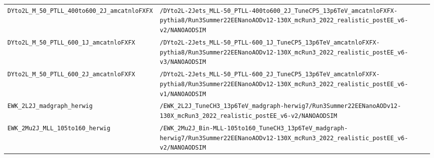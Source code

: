 \begin{longtable}{@{}>{\RaggedRight\arraybackslash}p{} >{\RaggedRight\arraybackslash}p{}@{}}
\addlinespace[2pt]
\texttt{DYto2L\_\allowbreak{}M\_\allowbreak{}50\_\allowbreak{}PTLL\_\allowbreak{}400to600\_\allowbreak{}2J\_\allowbreak{}amcatnloFXFX} & \texttt{/\allowbreak{}DYto2L-\allowbreak{}2Jets\_\allowbreak{}MLL-\allowbreak{}50\_\allowbreak{}PTLL-\allowbreak{}400to600\_\allowbreak{}2J\_\allowbreak{}TuneCP5\_\allowbreak{}13p6TeV\_\allowbreak{}amcatnloFXFX-\allowbreak{}pythia8/\allowbreak{}Run3Summer22EENanoAODv12-\allowbreak{}130X\_\allowbreak{}mcRun3\_\allowbreak{}2022\_\allowbreak{}realistic\_\allowbreak{}postEE\_\allowbreak{}v6-\allowbreak{}v2/\allowbreak{}NANOAODSIM} \\
\addlinespace[2pt]
\texttt{DYto2L\_\allowbreak{}M\_\allowbreak{}50\_\allowbreak{}PTLL\_\allowbreak{}600\_\allowbreak{}1J\_\allowbreak{}amcatnloFXFX} & \texttt{/\allowbreak{}DYto2L-\allowbreak{}2Jets\_\allowbreak{}MLL-\allowbreak{}50\_\allowbreak{}PTLL-\allowbreak{}600\_\allowbreak{}1J\_\allowbreak{}TuneCP5\_\allowbreak{}13p6TeV\_\allowbreak{}amcatnloFXFX-\allowbreak{}pythia8/\allowbreak{}Run3Summer22EENanoAODv12-\allowbreak{}130X\_\allowbreak{}mcRun3\_\allowbreak{}2022\_\allowbreak{}realistic\_\allowbreak{}postEE\_\allowbreak{}v6-\allowbreak{}v3/\allowbreak{}NANOAODSIM} \\
\addlinespace[2pt]
\texttt{DYto2L\_\allowbreak{}M\_\allowbreak{}50\_\allowbreak{}PTLL\_\allowbreak{}600\_\allowbreak{}2J\_\allowbreak{}amcatnloFXFX} & \texttt{/\allowbreak{}DYto2L-\allowbreak{}2Jets\_\allowbreak{}MLL-\allowbreak{}50\_\allowbreak{}PTLL-\allowbreak{}600\_\allowbreak{}2J\_\allowbreak{}TuneCP5\_\allowbreak{}13p6TeV\_\allowbreak{}amcatnloFXFX-\allowbreak{}pythia8/\allowbreak{}Run3Summer22EENanoAODv12-\allowbreak{}130X\_\allowbreak{}mcRun3\_\allowbreak{}2022\_\allowbreak{}realistic\_\allowbreak{}postEE\_\allowbreak{}v6-\allowbreak{}v1/\allowbreak{}NANOAODSIM} \\
\addlinespace[2pt]
\texttt{EWK\_\allowbreak{}2L2J\_\allowbreak{}madgraph\_\allowbreak{}herwig} & \texttt{/\allowbreak{}EWK\_\allowbreak{}2L2J\_\allowbreak{}TuneCH3\_\allowbreak{}13p6TeV\_\allowbreak{}madgraph-\allowbreak{}herwig7/\allowbreak{}Run3Summer22EENanoAODv12-\allowbreak{}130X\_\allowbreak{}mcRun3\_\allowbreak{}2022\_\allowbreak{}realistic\_\allowbreak{}postEE\_\allowbreak{}v6-\allowbreak{}v2/\allowbreak{}NANOAODSIM} \\
\addlinespace[2pt]
\texttt{EWK\_\allowbreak{}2Mu2J\_\allowbreak{}MLL\_\allowbreak{}105to160\_\allowbreak{}herwig} & \texttt{/\allowbreak{}EWK\_\allowbreak{}2Mu2J\_\allowbreak{}Bin-\allowbreak{}MLL-\allowbreak{}105to160\_\allowbreak{}TuneCH3\_\allowbreak{}13p6TeV\_\allowbreak{}madgraph-\allowbreak{}herwig7/\allowbreak{}Run3Summer22EENanoAODv12-\allowbreak{}130X\_\allowbreak{}mcRun3\_\allowbreak{}2022\_\allowbreak{}realistic\_\allowbreak{}postEE\_\allowbreak{}v6-\allowbreak{}v2/\allowbreak{}NANOAODSIM} \\

\end{longtable}
